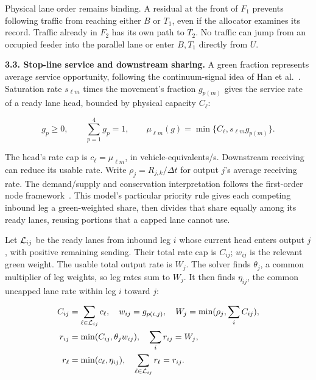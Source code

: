 \documentclass[10pt,a4paper]{article}
\begin{document}
Physical lane order remains binding. A residual at the front of $F_1$
prevents following traffic from reaching either $B$ or $T_1$, even if
the allocator examines its record. Traffic already in $F_2$ has its own
path to $T_2$. No traffic can jump from an occupied feeder into the
parallel lane or enter $B,T_1$ directly from $U$.


\textbf{3.3. Stop-line service and downstream sharing.}
A green fraction represents average service opportunity, following the
continuum-signal idea of Han et al.~\cite{han}. Saturation rate
$s_{\ell m}$ times the movement's fraction $g_{p(m)}$ gives the service
rate of a ready lane head, bounded by physical capacity $C_\ell$:
\par
\begin{equation}
 g_p\geq0,\qquad \sum_{p=1}^4g_p=1,\qquad
 \mu_{\ell m}(g)=\min\{C_\ell,s_{\ell m}g_{p(m)}\}.
 \label{eq:compact-action}
\end{equation}

The head's rate cap is $c_\ell=\mu_{\ell m}$, in vehicle-equivalents/s.
Downstream receiving can reduce its usable rate. Write
$\rho_j=R_{j,k}/\Delta t$ for output $j$'s average receiving rate.
The demand/supply and conservation interpretation follows the first-order
node framework~\cite{node}. This model's particular priority rule gives
each competing inbound leg a green-weighted share, then divides that
share equally among its ready lanes, reusing portions that a capped lane
cannot use.

Let ${\cal L}_{ij}$ be the ready lanes from inbound leg $i$ whose current
head enters output $j$, with positive remaining sending. Their total rate
cap is $C_{ij}$; $w_{ij}$ is the relevant green weight. The usable total
output rate is $W_j$. The solver finds $\theta_j$, a common multiplier of
leg weights, so leg rates sum to $W_j$. It then finds $\eta_{ij}$, the
common uncapped lane rate within leg $i$ toward $j$:
\par
\begin{align}
 C_{ij}&=\sum_{\ell\in{\cal L}_{ij}}c_\ell,\quad
 w_{ij}=g_{p(i,j)},\quad W_j=\min(\rho_j,\sum_iC_{ij}),\nonumber\\
 r_{ij}&=\min(C_{ij},\theta_jw_{ij}),\quad
                    \sum_i r_{ij}=W_j,\label{eq:compact-leg-sharing}\\
 r_\ell&=\min(c_\ell,\eta_{ij}),\quad
                    \sum_{\ell\in{\cal L}_{ij}}r_\ell=r_{ij}.
 \label{eq:compact-lane-sharing}
\end{align}
\end{document}
